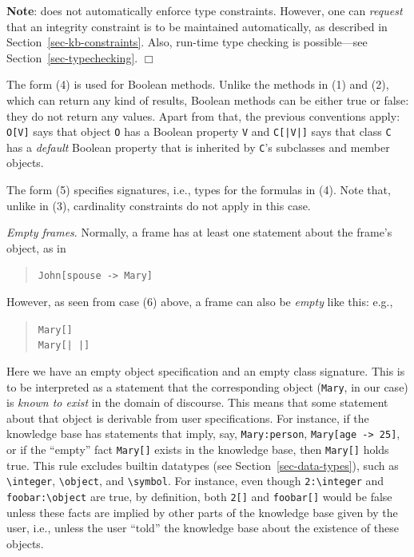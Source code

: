 \documentclass[11pt]{article}
\newcommand{\ERGO}{\mbox{\smaller{\ensuremath{\cal{E}}\smaller{{\sc{RGO}}}}}\xspace}
\newcommand{\FLSYSTEM}{\ERGO}
\newcommand{\mvd}{{\mbox{\tt \,->\,}}}  %
\newcommand{\bs}{\textbackslash}
\begin{document}
\begin{itemize}
  \noindent
  {\bf Note}: \FLSYSTEM does not automatically enforce type constraints.
    However, one can \emph{request} that
    an integrity constraint is to be maintained automatically, as described
    in Section~\ref{sec-kb-constraints}.
  Also, run-time type checking is possible---see Section~\ref{sec-typechecking}.
  \hfill$\Box$

  The form (4) is used for Boolean methods. Unlike the methods in (1) and (2),
  which can return any kind of results,  Boolean methods can be either true
  or false: they do not return any
  values. Apart from that, the previous conventions apply: \texttt{O[V]}
  says that object \texttt{O} has a Boolean property \texttt{V} and
  \texttt{C[|V|]} says that class \texttt{C} has a \emph{default} Boolean
  property that is inherited by \texttt{C}'s subclasses and member objects.

  The form (5) specifies signatures, i.e., types for the formulas in (4).
  Note that, unlike in (3), cardinality constraints do not apply in this
  case.

  \noindent
  \emph{Empty frames}.
  Normally, a frame has at least one statement about the frame's object,
  as in
  \begin{quote}
   \texttt{John[spouse -> Mary]}
  \end{quote}
  However, as seen from case (6) above, a frame can also be \emph{empty}
  like this:
  e.g., 
  \begin{quote}
   \texttt{Mary[]}  
   \\
   \texttt{Mary[| |]}  
  \end{quote}
  Here we have an empty object specification and an empty class signature.
  This is to be interpreted as a statement that the corresponding object
  (\texttt{Mary}, in our case) is \emph{known to exist} in the domain of
  discourse. This means that
  some statement about that object is derivable from user
  specifications. For instance, if the knowledge base has statements
  that imply, say, \texttt{Mary:person}, \texttt{Mary[age\mvd 25]}, or if
  the ``empty'' fact  \texttt{Mary[]} exists in the knowledge base, then
  \texttt{Mary[]} holds true. This rule excludes builtin datatypes (see
  Section~\ref{sec-data-types}), such as \texttt{\bs{}integer},
  \texttt{\bs{}object}, and \texttt{\bs{}symbol}. For instance, even though
  \texttt{2:\bs{}integer} and \texttt{foobar:\bs{}object} are true, by definition, both
  \texttt{2[]} and \texttt{foobar[]} would be false unless these facts are
  implied by other parts of the knowledge base given by the user, i.e.,
  unless the user ``told'' the knowledge base about the existence of these
  objects.
  

\end{itemize}
\end{document}
